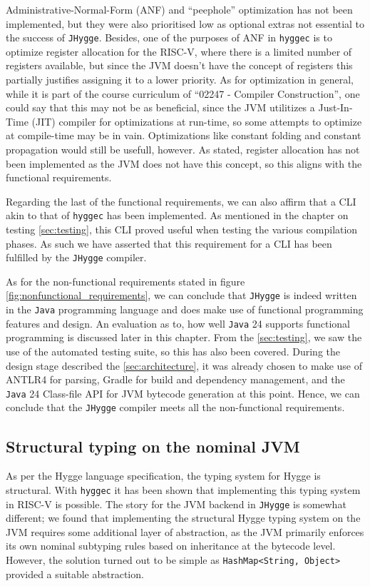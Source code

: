 Administrative-Normal-Form (ANF) and ``peephole'' optimization has not been implemented, but they were also prioritised low as optional
extras not essential to the success of \texttt{JHygge}. Besides, one of the purposes of ANF in \texttt{hyggec} is to optimize register
allocation for the RISC-V, where there is a limited number of registers available, but since the JVM doesn't have the concept of registers
this partially justifies assigning it to a lower priority. As for optimization in general, while it is part of the course
curriculum of ``02247 - Compiler Construction'', one could say that this may not be as beneficial, since the JVM utilitizes a Just-In-Time (JIT)
compiler for optimizations at run-time, so some attempts to optimize at compile-time may be in vain. Optimizations like constant folding
and constant propagation would still be usefull, however. As stated, register allocation has not been implemented as the JVM does not have
this concept, so this aligns with the functional requirements.

Regarding the last of the functional requirements, we can also affirm that a CLI akin to that of \texttt{hyggec} has been implemented. As
mentioned in the chapter on testing \ref{sec:testing}, this CLI proved useful when testing the various compilation phases.
As such we have asserted that this requirement for a CLI has been fulfilled by the \texttt{JHygge} compiler.

As for the non-functional requirements stated in figure \ref{fig:nonfunctional_requirements}, we can conclude that \texttt{JHygge} is indeed written in the \texttt{Java} programming language and does make use of functional programming features and design.
An evaluation as to, how well \texttt{Java} 24 supports functional programming
is discussed later in this chapter. From the \ref{sec:testing}, we saw the use of the automated testing suite, so this
has also been covered. During the design stage described the \ref{sec:architecture}, it was already chosen to make use
of ANTLR4 for parsing, Gradle for build and dependency management, and
the \texttt{Java} 24 Class-file API for JVM bytecode generation at this point.
Hence, we can conclude that the \texttt{JHygge} compiler meets all the non-functional requirements.

\subsection{Structural typing on the nominal JVM}

As per the Hygge language specification, the typing system for Hygge is structural. With \texttt{hyggec} it has been shown
that implementing this typing system in RISC-V is possible. The story for the JVM backend in \texttt{JHygge} is somewhat different;
we found that implementing the structural Hygge typing system on the JVM requires some additional layer of abstraction, as
the JVM primarily enforces its own nominal subtyping rules based on inheritance at the bytecode level.
However, the solution turned out to be simple as \texttt{HashMap<String, Object>} provided a suitable abstraction.

